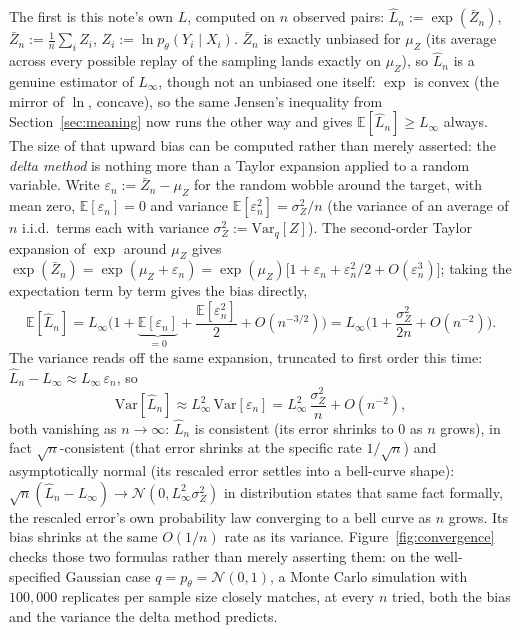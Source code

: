 \documentclass[11pt]{article}
\begin{document}
The first is this note's own $L$, computed on $n$ observed pairs:
$\hat L_n := \exp(\bar Z_n)$, $\bar Z_n := \frac1n\sum_i Z_i$, $Z_i :=
\ln p_\theta(Y_i \mid X_i)$. $\bar Z_n$ is exactly unbiased for
$\mu_Z$ (its average across every possible replay of the sampling
lands exactly on $\mu_Z$), so $\hat L_n$ is a genuine estimator of
$L_\infty$, though not an unbiased one itself: $\exp$ is convex (the
mirror of $\ln$, concave), so the same Jensen's inequality from
Section~\ref{sec:meaning} now runs the other way and gives $\mathbb
E[\hat L_n] \ge L_\infty$ always. The size of that upward bias can be
computed rather than merely asserted: the \emph{delta method} is
nothing more than a Taylor expansion applied to a random variable.
Write $\varepsilon_n := \bar Z_n - \mu_Z$ for the random wobble around
the target, with mean zero, $\mathbb E[\varepsilon_n]=0$ and variance
$\mathbb E[\varepsilon_n^2] = \sigma_Z^2/n$ (the variance of an average
of $n$ i.i.d.\ terms each with variance $\sigma_Z^2 :=
\mathrm{Var}_q[Z]$). The second-order Taylor expansion of $\exp$ around
$\mu_Z$ gives $\exp(\bar Z_n) = \exp(\mu_Z + \varepsilon_n) =
\exp(\mu_Z)\big[1 + \varepsilon_n + \varepsilon_n^2/2 +
O(\varepsilon_n^3)\big]$; taking the expectation term by term gives the
bias directly,
$$\mathbb E[\hat L_n] = L_\infty\Big(1 + \underbrace{\mathbb
E[\varepsilon_n]}_{=0} + \frac{\mathbb E[\varepsilon_n^2]}{2} +
O(n^{-3/2})\Big) = L_\infty\Big(1 + \frac{\sigma_Z^2}{2n} +
O(n^{-2})\Big).$$
The variance reads off the same expansion, truncated to first order
this time: $\hat L_n - L_\infty \approx L_\infty\,\varepsilon_n$, so
$$\mathrm{Var}[\hat L_n] \approx L_\infty^2\,\mathrm{Var}[\varepsilon_n]
= L_\infty^2\,\frac{\sigma_Z^2}{n} + O(n^{-2}),$$
both vanishing as $n \to \infty$: $\hat L_n$ is consistent (its error
shrinks to $0$ as $n$ grows), in fact $\sqrt n$-consistent (that error
shrinks at the specific rate $1/\sqrt n$) and asymptotically normal
(its rescaled error settles into a bell-curve shape): $\sqrt n(\hat
L_n - L_\infty) \to \mathcal N(0, L_\infty^2\sigma_Z^2)$ in
distribution states that same fact formally, the rescaled error's own
probability law converging to a bell curve as $n$ grows. Its bias
shrinks at the same $O(1/n)$ rate as its variance.
Figure~\ref{fig:convergence} checks those two formulas rather than
merely asserting them: on the well-specified Gaussian case $q =
p_\theta = \mathcal N(0,1)$, a Monte Carlo simulation with $100{,}000$
replicates per sample size closely matches, at every $n$ tried, both
the bias and the variance the delta method predicts.
\end{document}
